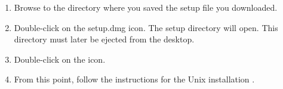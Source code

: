 
\begin{enumerate}
\item Browse to the directory where you saved the setup file you downloaded. 
\item Double-click on the setup.dmg icon. The setup directory will open. This directory must later be ejected from the desktop. 
\item Double-click on the  icon. 
\item From this point, follow the instructions for the Unix installation . 
\end{enumerate}

 




